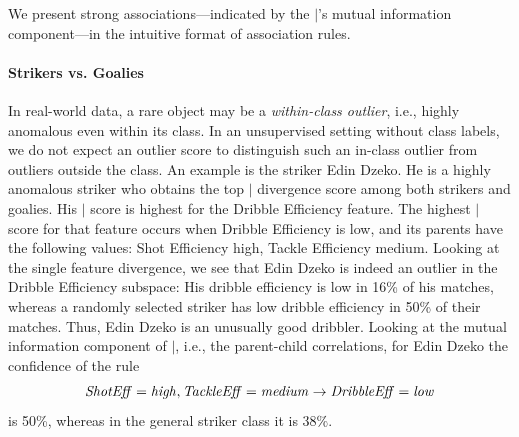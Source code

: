 \documentclass[conference]{IEEEtran}
\begin{document}
								We present strong associations---indicated by the $\mid$'s mutual information component---in the intuitive format of association rules.
								
								\paragraph{Strikers vs. Goalies} 
								In real-world data, a rare object may be a {\em within-class outlier}, i.e., highly anomalous even within its class. In an unsupervised setting without class labels, we do not expect an outlier score to distinguish such an in-class outlier from outliers outside the class. 
								An example is the striker Edin Dzeko. He is a highly anomalous striker who obtains 
								the top $\mid$ divergence score among both strikers and goalies. His $\mid$ score is highest for the Dribble Efficiency feature. The highest $\mid$ score for that feature occurs when Dribble Efficiency is low, and its parents have the following values: Shot Efficiency high, Tackle Efficiency medium. Looking at the single feature divergence, 
								we see that Edin Dzeko is indeed an outlier in the Dribble Efficiency subspace: His dribble efficiency is low in 16\% of his matches, whereas a randomly selected striker has low dribble efficiency in 50\% of their matches. Thus, Edin Dzeko is an unusually good dribbler. Looking at the mutual information component of $\mid$, i.e., the parent-child correlations, for Edin Dzeko the confidence of the rule 
								$$\it{ShotEff} = \it{high}, \it{TackleEff} = \it{medium}\rightarrow \it{DribbleEff} = \it{low}$$ is 50\%, whereas in the general striker class it is $38\%$.
								
\end{document}
